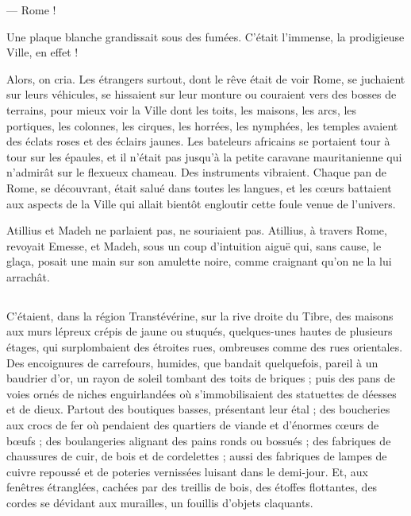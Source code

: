 \documentclass[a4paper, 11pt, oneside, polutonikogreek, french]{article}
\begin{document}
--- Rome !

Une plaque blanche grandissait sous des fumées. C'était l'immense, la prodigieuse Ville, en effet !

Alors, on cria. Les étrangers surtout, dont le rêve était de voir Rome, se juchaient sur leurs véhicules, se hissaient sur leur monture ou couraient vers des bosses de terrains, pour mieux voir la Ville dont les toits, les maisons, les arcs, les portiques, les colonnes, les cirques, les horrées, les nymphées, les temples avaient des éclats roses et des éclairs jaunes. Les bateleurs africains se portaient tour à tour sur les épaules, et il n'était pas jusqu'à la petite caravane mauritanienne qui n'admirât sur le flexueux chameau. Des instruments vibraient. Chaque pan de Rome, se découvrant, était salué dans toutes les langues, et les cœurs battaient aux aspects de la Ville qui allait bientôt engloutir cette foule venue de l'univers.

Atillius et Madeh ne parlaient pas, ne souriaient pas. Atillius, à travers Rome, revoyait Emesse, et Madeh, sous un coup d'intuition aiguë qui, sans cause, le glaça, posait une main sur son amulette noire, comme craignant qu'on ne la lui arrachât.
\clearpage
\subsection{}
\paragraph{}
C'étaient, dans la région Transtévérine, sur la rive droite du Tibre, des maisons aux murs lépreux crépis de jaune ou stuqués, quelques-unes hautes de plusieurs étages, qui surplombaient des étroites rues, ombreuses comme des rues orientales. Des encoignures de carrefours, humides, que bandait quelquefois, pareil à un baudrier d'or, un rayon de soleil tombant des toits de briques ; puis des pans de voies ornés de niches enguirlandées où s'immobilisaient des statuettes de déesses et de dieux. Partout des boutiques basses, présentant leur étal ; des boucheries aux crocs de fer où pendaient des quartiers de viande et d'énormes cœurs de bœufs ; des boulangeries alignant des pains ronds ou bossués ; des fabriques de chaussures de cuir, de bois et de cordelettes ; aussi des fabriques de lampes de cuivre repoussé et de poteries vernissées luisant dans le demi-jour. Et, aux fenêtres étranglées, cachées par des treillis de bois, des étoffes flottantes, des cordes se dévidant aux murailles, un fouillis d'objets claquants.
\end{document}

